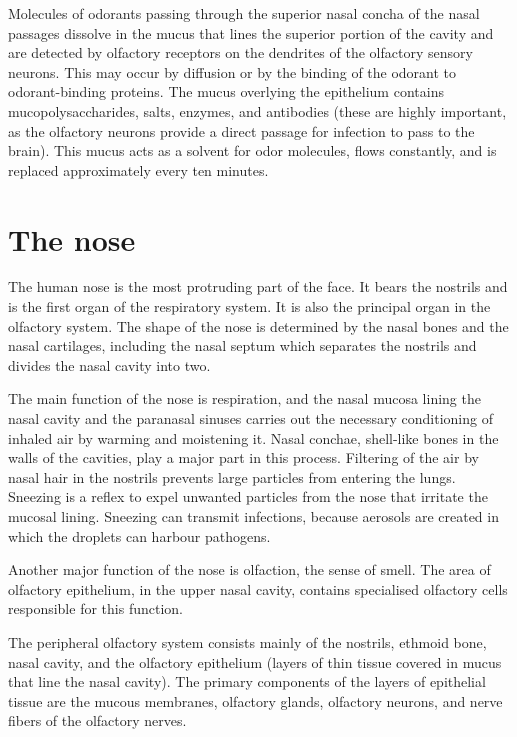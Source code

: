 Molecules of odorants passing through the superior nasal concha of the nasal passages dissolve in the mucus that lines the superior portion of the cavity and are detected by olfactory receptors on the dendrites of the olfactory sensory neurons. This may occur by diffusion or by the binding of the odorant to odorant-binding proteins. The mucus overlying the epithelium contains mucopolysaccharides, salts, enzymes, and antibodies (these are highly important, as the olfactory neurons provide a direct passage for infection to pass to the brain). This mucus acts as a solvent for odor molecules, flows constantly, and is replaced approximately every ten minutes.

\hypertarget{the-nose}{%
\section{The nose}\label{the-nose}}

The human nose is the most protruding part of the face. It bears the nostrils and is the first organ of the respiratory system. It is also the principal organ in the olfactory system. The shape of the nose is determined by the nasal bones and the nasal cartilages, including the nasal septum which separates the nostrils and divides the nasal cavity into two.

The main function of the nose is respiration, and the nasal mucosa lining the nasal cavity and the paranasal sinuses carries out the necessary conditioning of inhaled air by warming and moistening it. Nasal conchae, shell-like bones in the walls of the cavities, play a major part in this process. Filtering of the air by nasal hair in the nostrils prevents large particles from entering the lungs. Sneezing is a reflex to expel unwanted particles from the nose that irritate the mucosal lining. Sneezing can transmit infections, because aerosols are created in which the droplets can harbour pathogens.

Another major function of the nose is olfaction, the sense of smell. The area of olfactory epithelium, in the upper nasal cavity, contains specialised olfactory cells responsible for this function.

The peripheral olfactory system consists mainly of the nostrils, ethmoid bone, nasal cavity, and the olfactory epithelium (layers of thin tissue covered in mucus that line the nasal cavity). The primary components of the layers of epithelial tissue are the mucous membranes, olfactory glands, olfactory neurons, and nerve fibers of the olfactory nerves.

